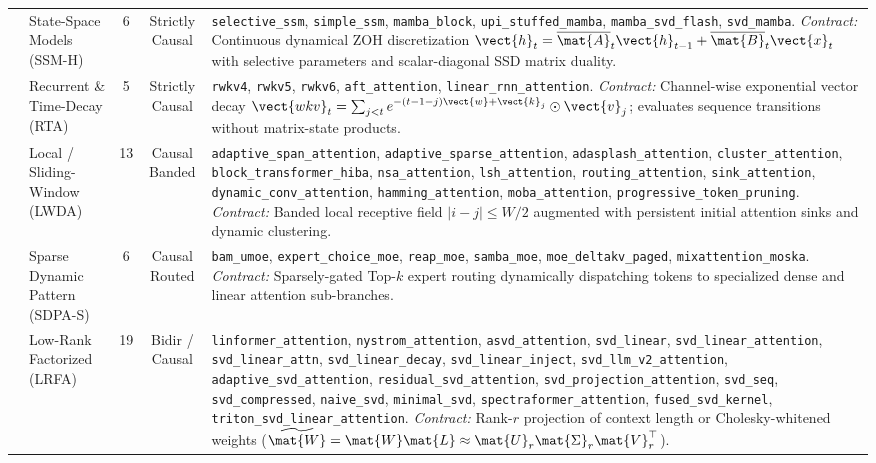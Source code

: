 \begin{table}[t]
{\begin{tabular}{@{}llccp{9.4cm}@{}}
\addlinespace[2pt]
4  & State-Space Models (SSM-H)           & 6  & Strictly Causal & \texttt{selective\_ssm}, \texttt{simple\_ssm}, \texttt{mamba\_block}, \texttt{upi\_stuffed\_mamba}, \texttt{mamba\_svd\_flash}, \texttt{svd\_mamba}. \newline \textit{Contract:} Continuous dynamical ZOH discretization $\vect{h}_t = \overline{\mat{A}}_t \vect{h}_{t-1} + \overline{\mat{B}}_t \vect{x}_t$ with selective parameters and scalar-diagonal SSD matrix duality. \\
\addlinespace[2pt]
5  & Recurrent \& Time-Decay (RTA)        & 5  & Strictly Causal & \texttt{rwkv4}, \texttt{rwkv5}, \texttt{rwkv6}, \texttt{aft\_attention}, \texttt{linear\_rnn\_attention}. \newline \textit{Contract:} Channel-wise exponential vector decay $\vect{wkv}_t = \sum_{j < t} e^{-(t-1-j)\vect{w} + \vect{k}_j} \odot \vect{v}_j$; evaluates sequence transitions without matrix-state products. \\
\addlinespace[2pt]
6  & Local / Sliding-Window (LWDA)    & 13 & Causal Banded & \texttt{adaptive\_span\_attention}, \texttt{adaptive\_sparse\_attention}, \texttt{adasplash\_attention}, \texttt{cluster\_attention}, \texttt{block\_transformer\_hiba}, \texttt{nsa\_attention}, \texttt{lsh\_attention}, \texttt{routing\_attention}, \texttt{sink\_attention}, \texttt{dynamic\_conv\_attention}, \texttt{hamming\_attention}, \texttt{moba\_attention}, \texttt{progressive\_token\_pruning}. \newline \textit{Contract:} Banded local receptive field $|i - j| \le W/2$ augmented with persistent initial attention sinks and dynamic clustering. \\
\addlinespace[2pt]
7  & Sparse Dynamic Pattern (SDPA-S)   & 6  & Causal Routed & \texttt{bam\_umoe}, \texttt{expert\_choice\_moe}, \texttt{reap\_moe}, \texttt{samba\_moe}, \texttt{moe\_deltakv\_paged}, \texttt{mixattention\_moska}. \newline \textit{Contract:} Sparsely-gated Top-$k$ expert routing dynamically dispatching tokens to specialized dense and linear attention sub-branches. \\
\addlinespace[2pt]
8  & Low-Rank Factorized (LRFA)           & 19 & Bidir / Causal & \texttt{linformer\_attention}, \texttt{nystrom\_attention}, \texttt{asvd\_attention}, \texttt{svd\_linear}, \texttt{svd\_linear\_attention}, \texttt{svd\_linear\_attn}, \texttt{svd\_linear\_decay}, \texttt{svd\_linear\_inject}, \texttt{svd\_llm\_v2\_attention}, \texttt{adaptive\_svd\_attention}, \texttt{residual\_svd\_attention}, \texttt{svd\_projection\_attention}, \texttt{svd\_seq}, \texttt{svd\_compressed}, \texttt{naive\_svd}, \texttt{minimal\_svd}, \texttt{spectraformer\_attention}, \texttt{fused\_svd\_kernel}, \texttt{triton\_svd\_linear\_attention}. \newline \textit{Contract:} Rank-$r$ projection of context length or Cholesky-whitened weights ($\widetilde{\mat{W}} = \mat{W}\mat{L} \approx \mat{U}_r \mat{\Sigma}_r \mat{V}_r^\top$). \\

\end{tabular}}
\end{table}
